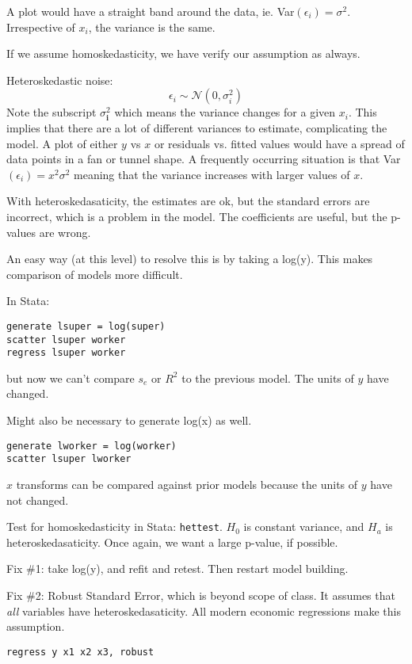 \documentclass[11pt, oneside]{article}   	%
\begin{document}
A plot would have a straight band around the data, ie. Var$(\epsilon_i) = \sigma^2$. Irrespective of $x_i$, the variance is the same.

If we assume homoskedasticity, we have verify our assumption as always.

Heteroskedastic noise:
\[
\epsilon_i \sim \mathcal{N}(0,\sigma^2_i)
\]
Note the subscript $\sigma^2_\textbf{i}$ which means the variance changes for a given $x_i$. This implies that there are a lot of different variances to estimate, complicating the model. A plot of either $y$ vs $x$ or residuals vs. fitted values would have a spread of data points in a fan or tunnel shape. A frequently occurring situation is that Var$(\epsilon_i) = x^2\sigma^2$ meaning that the variance increases with larger values of $x$.

With heteroskedasaticity, the estimates are ok, but the standard errors are incorrect, which is a problem in the model. The coefficients are useful, but the p-values are wrong.

An easy way (at this level) to resolve this is by taking a log(y). This makes comparison of models more difficult.

In Stata:
\begin{verbatim}
generate lsuper = log(super)
scatter lsuper worker
regress lsuper worker
\end{verbatim}

but now we can't compare $s_e$ or $R^2$ to the previous model. The units of $y$ have changed.

Might also be necessary to generate log(x) as well.
\begin{verbatim}
generate lworker = log(worker)
scatter lsuper lworker
\end{verbatim}

$x$ transforms can be compared against prior models because the units of $y$ have not changed.

Test for homoskedasticity in Stata: \texttt{hettest}. $H_0$ is constant variance, and $H_a$ is heteroskedasaticity. Once again, we want a large p-value, if possible.

Fix \#1: take log(y), and refit and retest. Then restart model building.

Fix \#2: Robust Standard Error, which is beyond scope of class. It assumes that \textit{all} variables have heteroskedasaticity. All modern economic regressions make this assumption.

\texttt{regress y x1 x2 x3, robust}
\end{document}
